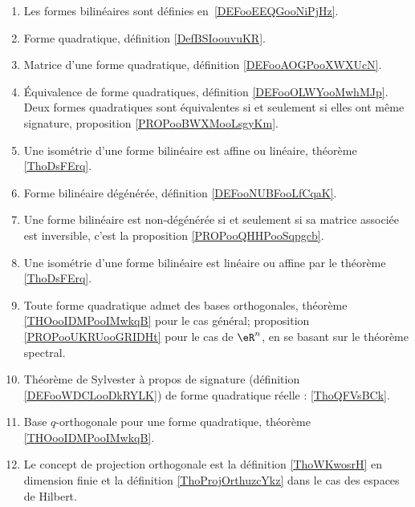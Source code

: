 
      \label{THEMEooOAJKooEvcCVn}
\begin{enumerate}
	\item
	      Les formes bilinéaires sont définies en~\ref{DEFooEEQGooNiPjHz}.
	\item
	      Forme quadratique, définition \ref{DefBSIoouvuKR}.
	\item
	      Matrice d'une forme quadratique, définition \ref{DEFooAOGPooXWXUcN}.
	\item
	      Équivalence de forme quadratiques, définition \ref{DEFooOLWYooMwhMJp}. Deux formes quadratiques sont équivalentes si et seulement si elles ont même signature, proposition \ref{PROPooBWXMooLsgyKm}.
	\item
	      Une isométrie d'une forme bilinéaire est affine ou linéaire, théorème \ref{ThoDsFErq}.
	\item
	      Forme bilinéaire dégénérée, définition \ref{DEFooNUBFooLfCqaK}.
	\item
	      Une forme bilinéaire est non-dégénérée si et seulement si sa matrice associée est inversible, c'est la proposition \ref{PROPooQHHPooSqpgcb}.
	\item
	      Une isométrie d'une forme bilinéaire est linéaire ou affine par le théorème \ref{ThoDsFErq}.
	\item
	      Toute forme quadratique admet des bases orthogonales, théorème \ref{THOooIDMPooIMwkqB} pour le cas général; proposition \ref{PROPooUKRUooGRIDHt} pour le cas de \( \eR^n\), en se basant sur le théorème spectral.
	\item
	      Théorème de Sylvester à propos de signature (définition \ref{DEFooWDCLooDkRYLK}) de forme quadratique réelle : \ref{ThoQFVsBCk}.
	\item
	      Base \( q\)-orthogonale pour une forme quadratique, théorème \ref{THOooIDMPooIMwkqB}.
	\item
	      Le concept de projection orthogonale est la définition \ref{ThoWKwosrH} en dimension finie et la définition \ref{ThoProjOrthuzcYkz} dans le cas des espaces de Hilbert.
\end{enumerate}


